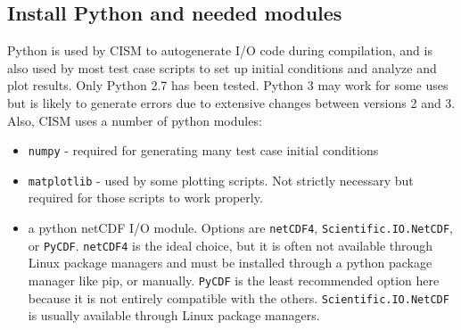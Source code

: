 \subsection{Install Python and needed modules}
Python is used by CISM to autogenerate I/O code during compilation, and is also
used by most test case scripts to set up initial conditions and analyze and plot
results.  Only Python 2.7 has been tested.  Python 3 may work for some uses but is
likely to generate errors due to extensive changes between versions 2 and 3.
Also, CISM uses a number of python modules:
\begin{itemize}
  \item \texttt{numpy} - required for generating many test case initial conditions
  \item \texttt{matplotlib} - used by some plotting scripts.  Not strictly necessary but required for those scripts to work properly.
  \item  a python netCDF I/O module.  Options are \texttt{netCDF4},  \texttt{Scientific.IO.NetCDF}, or \texttt{PyCDF}.  
\texttt{netCDF4} is the ideal choice, but it is often not available through Linux package managers and must be installed through a python package manager like pip, or manually.
\texttt{PyCDF} is the least recommended option here because it is not entirely compatible with the others.  \texttt{Scientific.IO.NetCDF} is usually available through Linux package managers.
\end{itemize}


